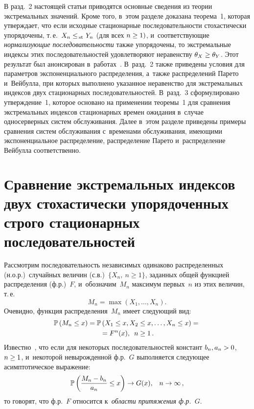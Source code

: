 \begin{multicols}{2}
В разд.~2 настоящей статьи
приводятся основные сведения из теории экстремальных значений. Кроме того, 
в~этом разделе доказана  теорема~1, которая  утверж\-да\-ет, что если исходные 
стационарные последовательности стохастически упорядочены,  т.\,е.\  $X_n\hm\le_{\!\mathrm{st}}\  
Y_n$ (для всех $n\hm\ge 1)$, и~соответствующие \textit{нор\-ма\-ли\-зу\-ющие 
последовательности} также упорядочены,  то экстремальные индексы этих 
последовательностей  удовле\-тво\-ря\-ют неравенству $\theta_X\hm\ge \theta_Y$.
 Этот результат  был анонсирован
в~работах~\cite{dccn2021, tomsk2021}.
В~разд.~2 также приведены условия для  па\-ра\-мет\-ров экспоненциального  
распределения, а~также распределений Парето и~Вейбулла, при которых выполнено 
указанное  неравенство для экстремальных индексов двух стационарных 
последовательностей.
В~разд.~3 сформулировано утверж\-де\-ние~1, которое   основано на применении 
теоремы~1 для  сравнения экстремальных индексов стационарных времен ожидания 
в~случае  односерверных сис\-тем обслуживания. Далее в~этом разделе  приведены   
примеры  сравнения сис\-тем обслуживания 
с~временами обслуживания, име\-ющи\-ми экспоненциальное распределение, распределение 
Парето и~распределение Вейбулла соответственно.


\section{Сравнение экстремальных индексов двух стохастически упорядоченных 
строго стационарных
последовательностей}

Рассмотрим последовательность независимых одинаково  распределенных (н.о.р.)\ 
случайных величин (с.в.)\  $\{ X_n , \ n\ge 1\}$, заданных   общей функцией 
распределения (ф.р.)~$F$, и~обозначим~$M_n$ максимум  первых~$n$ из этих 
величин, т.\,е.\
\begin{equation*}
   M_n=\max \left(X_1, \dots , X_n\right).
\end{equation*}
Очевидно,   функция распределения~$M_n$ имеет сле\-ду\-ющий вид:
 \begin{multline*}
\mathbb{P} \left(
M_n \le x\right)= \mathbb{P} \left(X_1\le x, X_2\le x, \dots, X_n\le x\right) ={}\\
{}= F^n (x),\enskip 
n\ge1\,.
\end{multline*}
Известно~\cite{Leadbetter}, что   если для некоторых последовательностей 
констант $b_n, a_n\hm>0$,  $n\hm\ge 1$, и~некоторой  невырожденной ф.р.~$G$ 
выполняется сле\-ду\-ющее асимптотическое выражение:
  \begin{equation}
  \label{max1}
       \mathbb{P}\left(\displaystyle\frac{\displaystyle M_n-b_n\mathstrut}{\displaystyle a_n\mathstrut} \le x\right) \to G(x), \enskip \ n\to\infty\,,
  \end{equation}
 то говорят, что ф.р.~$F$ относится к~\textit{об\-ласти притяжения ф.р.}~$G$.


\end{multicols}
